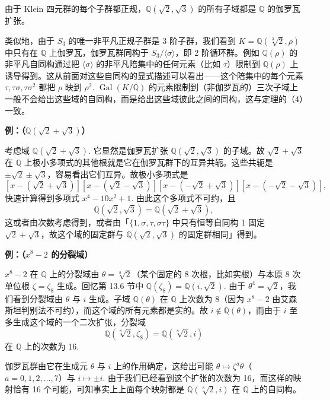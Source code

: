 由于 Klein 四元群的每个子群都正规，\(\mathbb{Q}(\sqrt{2}, \sqrt{3})\) 的所有子域都是 \(\mathbb{Q}\) 的伽罗瓦扩张。

类似地，由于 \(S_3\) 的唯一非平凡正规子群是 3 阶子群，我们看到 \(K = \mathbb{Q}(\sqrt[3]{2}, \rho)\) 中只有在 \(\mathbb{Q}\) 上伽罗瓦，伽罗瓦群同构于 \(S_3/\langle \sigma \rangle\)，即 2 阶循环群。例如 \(\mathbb{Q}(\rho)\) 的非平凡自同构通过把 \(\langle \sigma \rangle\) 的非平凡陪集中的任何元素（比如 \(\tau\)）限制到 \(\mathbb{Q}(\rho)\) 上诱导得到。这从前面对这些自同构的显式描述可以看出——这个陪集中的每个元素 \(\tau, \tau\sigma, \tau\sigma^2\) 都把 \(\rho\) 映到 \(\rho^2\). \(\operatorname{Gal}(K/\mathbb{Q})\) 的元素限制到（非伽罗瓦的）三次子域上一般不会给出这些域的自同构，而是给出这些域彼此之间的同构，这与定理的（4）一致。

\noindent\textbf{例：（\(\mathbb{Q}(\sqrt{2}+\sqrt{3})\)）}

考虑域 \(\mathbb{Q}(\sqrt{2}+\sqrt{3})\). 它显然是伽罗瓦扩张 \(\mathbb{Q}(\sqrt{2}, \sqrt{3})\) 的子域。故 \(\sqrt{2}+\sqrt{3}\) 在 \(\mathbb{Q}\) 上极小多项式的其他根就是它在伽罗瓦群下的互异共轭。这些共轭是 \(\pm\sqrt{2}\pm\sqrt{3}\)，容易看出它们互异。故极小多项式是
\[
[x-(\sqrt{2}+\sqrt{3})][x-(\sqrt{2}-\sqrt{3})][x-(-\sqrt{2}+\sqrt{3})][x-(-\sqrt{2}-\sqrt{3})],
\]
快速计算得到多项式 \(x^4-10x^2+1\). 由此这个多项式不可约，且
\[
\mathbb{Q}(\sqrt{2}, \sqrt{3}) = \mathbb{Q}(\sqrt{2}+\sqrt{3}),
\]
这或者由次数考虑得到，或者由「\(\{1, \sigma, \tau, \sigma\tau\}\) 中只有恒等自同构 1 固定 \(\sqrt{2}+\sqrt{3}\)，故这个域的固定群与 \(\mathbb{Q}(\sqrt{2}, \sqrt{3})\) 的固定群相同」得到。

\noindent\textbf{例：（\(x^8-2\) 的分裂域）}

\(x^8-2\) 在 \(\mathbb{Q}\) 上的分裂域由 \(\theta = \sqrt[8]{2}\)（某个固定的 8 次根，比如实根）与本原 8 次单位根 \(\zeta = \zeta_8\) 生成。回忆第 13.6 节中 \(\mathbb{Q}(\zeta_8) = \mathbb{Q}(i, \sqrt{2})\). 由于 \(\theta^4 = \sqrt{2}\)，我们看到分裂域由 \(\theta\) 与 \(i\) 生成。子域 \(\mathbb{Q}(\theta)\) 在 \(\mathbb{Q}\) 上次数为 8（因为 \(x^8-2\) 由艾森斯坦判别法不可约），而这个域的所有元素都是实的。故 \(i \notin \mathbb{Q}(\theta)\)，而由于 \(i\) 至多生成这个域的一个二次扩张，分裂域
\[
\mathbb{Q}(\sqrt[8]{2}, \zeta_8) = \mathbb{Q}(\sqrt[8]{2}, i)
\]
在 \(\mathbb{Q}\) 上的次数为 16.

伽罗瓦群由它在生成元 \(\theta\) 与 \(i\) 上的作用确定，这给出可能 \(\theta \mapsto \zeta^a\theta\)（\(a = 0, 1, 2, \ldots, 7\)）与 \(i \mapsto \pm i\). 由于我们已经看到这个扩张的次数为 16，而这样的映射恰有 16 个可能，可知事实上上面每个映射都是 \(\mathbb{Q}(\sqrt[8]{2}, i)\) 在 \(\mathbb{Q}\) 上的自同构。

